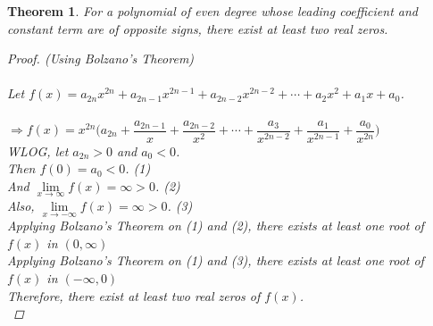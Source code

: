 \documentclass[14]{article}
\newtheorem{theorem}{Theorem}
\theoremstyle{definition}
\begin{document}
\begin{theorem}
For a polynomial of even degree whose leading coefficient and constant term are of opposite signs, there exist at least two real zeros.
\begin{proof}
(Using Bolzano's Theorem)\\\\
Let $f(x) = a_{2n} x^{2n} + a_{2n-1}x^{2n-1} + a_{2n-2}x^{2n-2} + \cdots + a_2 x^2 + a_1 x + a_0$.\\\\
$\Rightarrow f(x) = x^{2n} \Big( a_{2n} +
\dfrac{a_{2n-1}}{x} + \dfrac{a_{2n-2}}{x^2} + \cdots + \dfrac{a_{3}}{x^{2n-2}} + \dfrac{a_1}{x^{2n-1}} + \dfrac{a_0}{x^{2n}} \Big)$\\
WLOG, let $a_{2n} > 0$ and $a_0 < 0$.\\
Then $f(0) = a_{0} < 0$. (1)\\
And $\lim\limits_{x \to \infty} f(x) = \infty > 0$. (2)\\
Also, $\lim\limits_{x \to -\infty} f(x) =\infty > 0$. (3)\\
Applying Bolzano's Theorem on (1) and (2), there exists at least one root of $f(x)$ in $(0, \infty)$\\
Applying Bolzano's Theorem on (1) and (3), there exists at least one root of $f(x)$ in $(-\infty, 0)$\\
Therefore, there exist at least two real zeros of $f(x)$.\\
\end{proof}
\end{theorem}
\pagebreak
\end{document}
